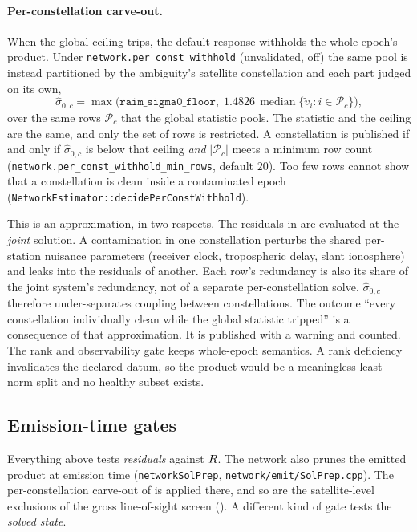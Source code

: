 \documentclass[main.tex]{subfiles}
\begin{document}
\paragraph{Per-constellation carve-out.}  When the global ceiling trips, the
default response withholds the whole epoch's product.  Under
\texttt{network.per\_const\_withhold} (unvalidated, off) the same pool is
instead partitioned by the
ambiguity's satellite constellation and each part judged on its own,
\begin{equation}
\hat\sigma_{0,c}
  = \max\!\bigl(\texttt{raim\_sigma0\_floor},\;
        1.4826\,\operatorname{median}\{\tilde v_i : i \in \mathcal{P}_c\}\bigr),
\label{eq:qc-sigma0-perconst}
\end{equation}
over the same rows $\mathcal{P}_c$ that the global statistic pools.  The
statistic and the ceiling are the same, and only the set of rows is
restricted.  A constellation is published if and only if
$\hat\sigma_{0,c}$ is below that ceiling \emph{and} $|\mathcal{P}_c|$
meets a minimum row count (\texttt{network.per\_const\_withhold\_min\_rows},
default $20$).
Too few rows cannot show that a
constellation is clean inside a contaminated epoch
(\texttt{NetworkEstimator::decidePerConstWithhold}).

This is an approximation, in two respects.  The residuals in
 are evaluated at the \emph{joint} solution.
A contamination in one constellation perturbs the shared per-station
nuisance parameters (receiver clock, tropospheric delay, slant
ionosphere) and leaks into the residuals of another.  Each row's
redundancy is also its share of the joint system's redundancy, not of a
separate per-constellation solve.  $\hat\sigma_{0,c}$ therefore
under-separates coupling between constellations.  The outcome ``every
constellation individually clean while the global statistic tripped'' is
a consequence of that approximation.  It is published with a warning and
counted.  The rank and observability gate keeps whole-epoch semantics.
A rank deficiency invalidates the declared datum, so the product would
be a meaningless least-norm split and no healthy subset exists.

\subsection{Emission-time gates}\label{sec:stoch-emission-gates}

Everything above tests \emph{residuals} against $R$.  The network also
prunes the emitted product at emission time (\texttt{networkSolPrep},
\texttt{network/emit/SolPrep.cpp}).  The per-constellation carve-out of
 is applied there, and so are the satellite-level
exclusions of the gross line-of-sight screen
().  A different kind
of gate tests the \emph{solved state}.
\end{document}
